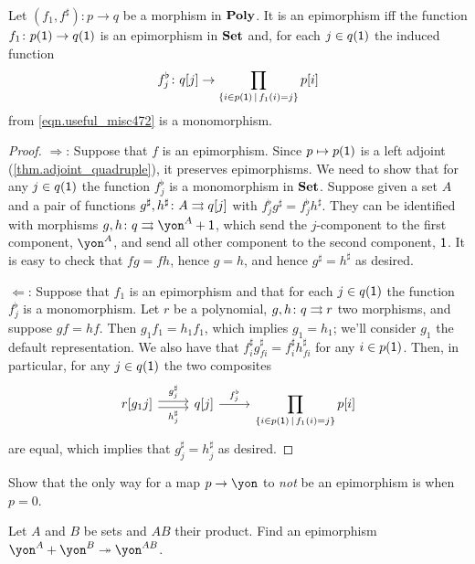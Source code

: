 \documentclass[Book-Poly]{subfiles}
\begin{document}
\begin{proposition}\label{prop.epis_in_poly}
Let $(f_1,f^\sharp)\colon p\to q$ be a morphism in $\mathbf{Poly}$. It is an epimorphism iff the function $f_1\colon p(\textsf{1})\to q(\textsf{1})$ is an epimorphism in $\mathbf{Set}$ and, for each $j\in q(\textsf{1})$ the induced function 
\[
f^\flat_j\colon q[j]\to\prod_{\{i\in p(\textsf{1})\,\mid\, f_1(i)=j\}}p[i]
\]
from \eqref{eqn.useful_misc472} is a monomorphism.
\end{proposition}
\begin{proof}
\noindent$\Rightarrow$: Suppose that $f$ is an epimorphism. Since $p\mapsto p(\textsf{1})$ is a left adjoint (\cref{thm.adjoint_quadruple}), it preserves epimorphisms. We need to show that for any $j\in q(\textsf{1})$ the  function $f^\flat_j$ is a monomorphism in $\mathbf{Set}$. Suppose given a set $A$ and a pair of functions $g^\sharp,h^\sharp\colon A\rightrightarrows q[j]$ with $f^\flat_jg^\sharp=f^\flat_jh^\sharp$. They can be identified with morphisms $g,h\colon q\tto \yon^A+\1$, which send the $j$-component to the first component, $\yon^A$, and send all other component to the second component, $\textsf{1}$. It is easy to check that $fg=fh$, hence $g=h$, and hence $g^\sharp=h^\sharp$ as desired.

\noindent$\Leftarrow$: Suppose that $f_1$ is an epimorphism and that for each $j\in q(\textsf{1})$ the function $f^\flat_j$ is a monomorphism. Let $r$ be a polynomial, $g,h\colon q\rightrightarrows r$ two morphisms, and suppose $gf=hf$. Then $g_1f_1=h_1f_1$, which implies $g_1=h_1$; we'll consider $g_1$ the default representation. We also have that $f^\sharp_ig^\sharp_{fi}=f^\sharp_ih^\sharp_{fi}$ for any $i\in p(\textsf{1})$. Then, in particular, for any $j\in q(\textsf{1})$ the two composites
\[
\begin{tikzcd}
	r[g_1j]\ar[r, shift left, "g^\sharp_j"]\ar[r, shift right, "h^\sharp_j"']&q[j]\ar[r, "f^\flat_j"]&\displaystyle\prod_{\{i\in p(\1)\,\mid\,f_1(i)=j\}}p[i]
\end{tikzcd}
\]
are equal, which implies that $g^\sharp_j=h^\sharp_j$ as desired.
\end{proof}

\begin{exercise}
Show that the only way for a map $p\to\yon$ to \emph{not} be an epimorphism is when $p=0$.
\end{exercise}

\begin{proposition}
Let $A$ and $B$ be sets and $AB$ their product. Find an epimorphism $\yon^A+\yon^B\surj\yon^{AB}$.
\end{proposition}
\end{document}
